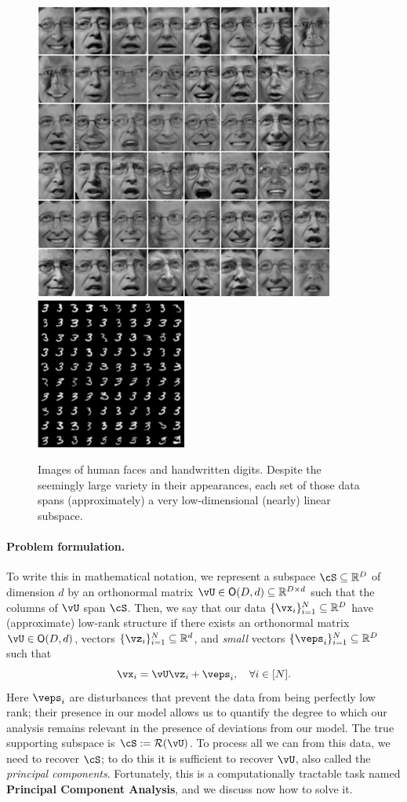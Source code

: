 \documentclass[../../book-main.tex]{subfiles}
\begin{document}
\begin{figure}
    \centering
    \includegraphics[width=0.4\linewidth]{figs_chap2/faces.png}
    \hspace{5mm} \includegraphics[width=0.395\linewidth]{figs_chap2/handwritten-digits.png}   
    \caption{Images of human faces and handwritten digits. Despite the seemingly large variety in their appearances, each set of those data spans (approximately) a very low-dimensional (nearly) linear subspace.}
    \label{fig:faces-digits}
\end{figure}

\paragraph{Problem formulation.}
To write this in mathematical notation, we represent a subspace \(\cS \subseteq \R^{D}\) of dimension \(d\)  by an orthonormal matrix \(\vU \in \O(D, d) \subseteq \R^{D \times d}\) such that the columns of \(\vU\) span \(\cS\). Then, we say that our data \(\{\vx_{i}\}_{i = 1}^{N} \subseteq \R^{D}\) have (approximate) low-rank structure if there exists an orthonormal matrix \(\vU \in \O(D, d)\), vectors \(\{\vz_{i}\}_{i = 1}^{N} \subseteq \R^{d}\), and \textit{small} vectors \(\{\veps_{i}\}_{i = 1}^{N} \subseteq \R^{D}\) such that 
\begin{equation}\label{eq:pca_dgp}
    \vx_{i} = \vU\vz_{i} + \veps_{i}, \quad \forall i \in [N].
\end{equation}
Here \(\veps_{i}\) are disturbances that prevent the data from being perfectly low rank; their presence in our model allows us to quantify the degree to which our analysis remains relevant in the presence of deviations from our model. The true supporting subspace is \(\cS := \Range(\vU)\). To process all we can from this data, we need to recover \(\cS\); to do this it is sufficient to recover \(\vU\), also called the \textit{principal components}. Fortunately, this is a computationally tractable task named {\bf Principal Component Analysis}, and we discuss now how to solve it.
\end{document}

